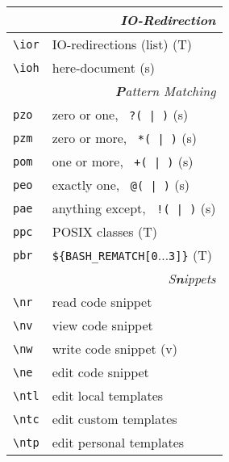 \documentclass[oneside,11pt,landscape,DIV16]{scrartcl}
\begin{document}
\begin{multicols}{3}
\begin{center}
\begin{tabular}[]{|p{11mm}|p{60mm}|}
\hline
\multicolumn{2}{|r|}{\textsl{\textbf{I}O-Redirection}}                 \\[1.0ex]
\hline \verb'\ior'   & IO-redirections (list)           \hfill (T)\\
\hline \verb'\ioh'   & here-document                    \hfill (s)\\
\hline
%
\hline
\multicolumn{2}{|r|}{\textsl{\textbf{P}attern Matching}}     \\[1.0ex]
\hline     \verb'pzo' & zero or one,      \verb' ?( | )'  \hfill (s)\\ 
\hline     \verb'pzm' & zero or more,     \verb' *( | )'  \hfill (s)\\ 
\hline     \verb'pom' & one or more,      \verb' +( | )'  \hfill (s)\\ 
\hline     \verb'peo' & exactly one,      \verb' @( | )'  \hfill (s)\\ 
\hline     \verb'pae' & anything except,  \verb' !( | )'  \hfill (s)\\ 
\hline     \verb'ppc' & POSIX classes                     \hfill (T)\\ 
\hline     \verb'pbr' &  \verb'${BASH_REMATCH[0'$\ldots$\verb'3]}'  \hfill (T)\\ 
\hline
%
\hline
\multicolumn{2}{|r|}{\textsl{S\textbf{n}ippets}}               \\[1.0ex]
\hline \verb'\nr'  & read code snippet         \\
\hline \verb'\nv'  & view code snippet         \\
\hline \verb'\nw'  & write code snippet        \hfill (v)\\
\hline \verb'\ne'  & edit code snippet         \\
%
\hline \verb'\ntl' & edit local templates      \\
\hline \verb'\ntc' & edit custom templates     \\
\hline \verb'\ntp' & edit personal templates   \\

\end{tabular}
\end{center}
\end{multicols}
\end{document}
